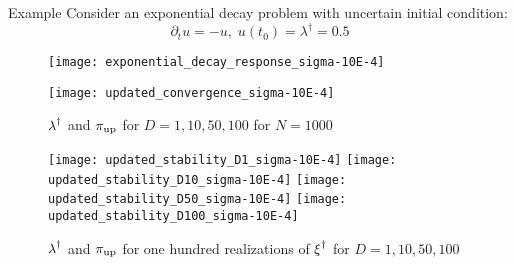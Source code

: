 \begin{block}{Example}
\centering
    Consider an exponential decay problem with uncertain initial condition:
    \begin{equation*}
        \partial_t u = - u, \; u(t_0) = \lambda^\dagger = 0.5
    \end{equation*}

    \begin{figure}
        \texttt{[image: exponential\_decay\_response\_sigma-10E-4]}
    \end{figure}


\vspace{1cm}

\centering
{}
\vspace{-1cm}
    \begin{figure}
        \texttt{[image: updated\_convergence\_sigma-10E-4]}
        \caption*{$\operatorname*{\lambda}^\dagger$ and $\operatorname*{\pi_{up}}$ for $D=1, 10, 50, 100$ for $N=1000$}
    \end{figure}


\vspace{1cm}

\vspace{-1cm}
    \begin{figure}
        \texttt{[image: updated\_stability\_D1\_sigma-10E-4]}
        \texttt{[image: updated\_stability\_D10\_sigma-10E-4]}
        \texttt{[image: updated\_stability\_D50\_sigma-10E-4]}
        \texttt{[image: updated\_stability\_D100\_sigma-10E-4]}
        \caption*{$\operatorname*{\lambda}^\dagger$ and $\operatorname*{\pi_{up}}$ for one hundred realizations of $\operatorname*{\xi}^\dagger$ for $D=1, 10, 50, 100$}
    \end{figure}

\end{block}
